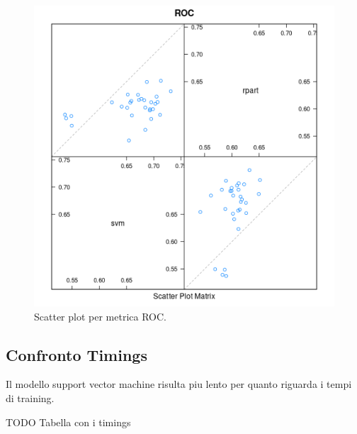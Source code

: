 \begin{figure}[H]
	\centering
	\includegraphics[width=13cm]{../images/compare_splom_plot_fix.png}
	\caption{Scatter plot per metrica ROC.}
	\label{fig:compare_splom_plot}
\end{figure}

\subsection{Confronto Timings} Il modello support vector machine
risulta piu lento per quanto riguarda i tempi di training.

TODO
Tabella con i timings
